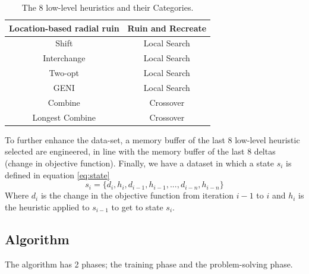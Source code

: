 \documentclass[a4paper,12pt]{article}
\begin{document}
{\begin{table}[ht]
\begin{tabular}{ | c | c | }
                            \hline 
                            Location-based radial ruin & Ruin and Recreate \\
                            \hline 
                            Shift & Local Search \\
                            \hline 
                            Interchange & Local Search\\
                            \hline 
                            Two-opt & Local Search \\
                            \hline 
                            GENI & Local Search \\
                            \hline
                            Combine & Crossover \\
                            \hline
                            Longest Combine & Crossover \\
                            \hline
                        \end{tabular}
                        \caption{The 8 low-level heuristics and their Categories.} 
                \end{table}
                To further enhance the data-set, a memory buffer of the last 8 low-level heuristic selected are engineered, in line with the memory buffer of 
                the last 8 deltas (change in objective function). \newline 
                \newline 
                Finally, we have a dataset in which a state $s_i$ is defined in equation \ref{eq:state}
                \begin{equation} \label{eq:state}
                     s_{i} = \{ d_{i}, h_{i}, d_{i-1},h_{i-1},...,d_{i-n},h_{i-n} \} 
                \end{equation} 
                Where $d_i$ is the change in the objective function from iteration $i-1$ to $i$ and $h_i$ is the heuristic applied to $s_{i-1}$ to get to state $s_i$.
            } 
    \subsection{Algorithm}  
        \par{
            \noindent The algorithm has 2 phases; the training phase and the problem-solving phase.\newline 
            \newline 
        }
\end{document}
